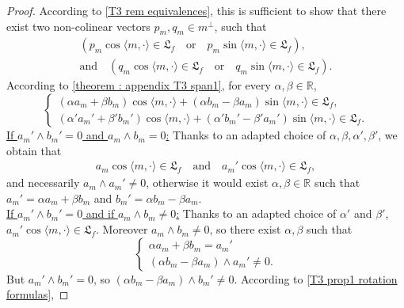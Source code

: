\documentclass[10pt]{article}
\newcommand{\R}{{\mathbb R}}
\newcommand{\la}{\langle}
\newcommand{\ra}{\rangle}
\newcommand{\we}{\wedge}
\begin{document}
\begin{proof}
    According to \cref{T3 rem equivalences}, this is sufficient to show that there exist two non-colinear vectors $p_m,q_m\in m^{\perp}$, such that  \begin{align*}
        (p_m\cos \la m,\cdot \ra\in \mathfrak{L}_f \quad \text{or} \quad p_m\sin \la m,\cdot \ra\in \mathfrak{L}_f), \\
        \text{and}\quad (q_m\cos \la m,\cdot \ra \in \mathfrak{L}_f \quad \text{or} \quad q_m\sin \la m,\cdot \ra \in \mathfrak{L}_f).
    \end{align*} 
    According to \cref{theorem : appendix T3 span1}, for every $\alpha,\beta\in \R$, 
    \begin{equation} \label{T3 prop1 rotation formulas}
    \left\{\begin{array}{ll}
         (\alpha a_m+\beta b_m)\cos \la m,\cdot \ra + (\alpha b_m -\beta a_m)\sin \la m,\cdot \ra \in \mathfrak{L}_f,  \\
         (\alpha' a_m'+\beta' b_m')\cos \la m,\cdot \ra + (\alpha' b_m' -\beta' a_m')\sin \la m,\cdot \ra \in \mathfrak{L}_f.
    \end{array}\right.
    \end{equation}
    \underline{If $a_m' \we b_m'=0$ and $a_m\we b_m=0$:} Thanks to an adapted choice of $\alpha,\beta,\alpha',\beta'$, we obtain that 
    \begin{align*}
        a_m\cos \la m,\cdot \ra\in \mathfrak{L}_f \quad \text{and} \quad 
        a_m'\cos \la m,\cdot \ra\in \mathfrak{L}_f,
    \end{align*}
    and necessarily $a_m\we a_m'\neq 0$, otherwise it would exist $\alpha,\beta \in \R$ such that $a_m'=\alpha a_m +\beta b_m$ and $b_m'=\alpha b_m-\beta a_m$. \\
    \underline{If $a_m' \we b_m'=0$ and if $a_m\we b_m \neq 0$:} Thanks to an adapted choice of $\alpha'$ and $\beta'$, $a_m'\cos \la m,\cdot \ra\in \mathfrak{L}_f$. Moreover $a_m\we b_m \neq 0$, so there exist $\alpha,\beta$ such that 
    \begin{equation*}
        \left\{\begin{array}{ll}
              \alpha a_m +\beta b_m=a_m' \\
              (\alpha b_m -\beta a_m)\we a_m' \neq 0.
        \end{array}\right.
    \end{equation*}
    But $a_m'\we b_m'=0$, so $(\alpha b_m-\beta a_m) \we b_m'\neq 0$. According to \eqref{T3 prop1 rotation formulas},

\end{proof}
\end{document}
